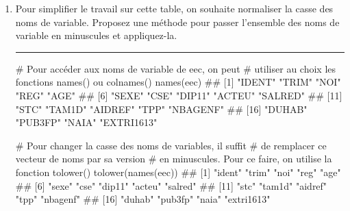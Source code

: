 \documentclass[12pt,twosided, notitlepage]{book}
\newenvironment{Shaded}{}{}
\newcommand{\CommentTok}[1]{\textcolor[rgb]{0.00,0.50,0.00}{#1}}
\newcommand{\KeywordTok}[1]{\textcolor[rgb]{0.00,0.00,1.00}{#1}}
\newcommand{\NormalTok}[1]{#1}
\newif \ifsol
\renewenvironment{Shaded}{\begin{snugshade}}{\end{snugshade}}
\begin{document}
\begin{enumerate}
  \begin{center} \rule{0.5\linewidth}{\linethickness}\end{center} 
    \bigskip 
    \fi
\item
  Pour simplifier le travail sur cette table, on souhaite normaliser la
  casse des noms de variable. Proposez une méthode pour passer
  l'ensemble des noms de variable en minuscules et
  appliquez-la.

  \ifsol  \textbf{Indication} Pensez à utiliser les fonctions
  \texttt{names()} et \texttt{tolower()}.\fi 

  \ifsol 

  \begin{center} \rule{0.5\linewidth}{\linethickness}\end{center}

\begin{Shaded}
\begin{Highlighting}[]
\CommentTok{# Pour accéder aux noms de variable de eec, on peut}
\CommentTok{# utiliser au choix les fonctions names() ou colnames()}
\KeywordTok{names}\NormalTok{(eec)}
\NormalTok{  ##  [1] "IDENT"     "TRIM"      "NOI"       "REG"       "AGE"      }
\NormalTok{  ##  [6] "SEXE"      "CSE"       "DIP11"     "ACTEU"     "SALRED"   }
\NormalTok{  ## [11] "STC"       "TAM1D"     "AIDREF"    "TPP"       "NBAGENF"  }
\NormalTok{  ## [16] "DUHAB"     "PUB3FP"    "NAIA"      "EXTRI1613"}

\CommentTok{# Pour changer la casse des noms de variables, il suffit}
\CommentTok{# de remplacer ce vecteur de noms par sa version }
\CommentTok{# en minuscules. Pour ce faire, on utilise la fonction tolower()}
\KeywordTok{tolower}\NormalTok{(}\KeywordTok{names}\NormalTok{(eec))}
\NormalTok{  ##  [1] "ident"     "trim"      "noi"       "reg"       "age"      }
\NormalTok{  ##  [6] "sexe"      "cse"       "dip11"     "acteu"     "salred"   }
\NormalTok{  ## [11] "stc"       "tam1d"     "aidref"    "tpp"       "nbagenf"  }
\NormalTok{  ## [16] "duhab"     "pub3fp"    "naia"      "extri1613"}


\end{Highlighting}
\end{Shaded}
\end{enumerate}
\end{document}
